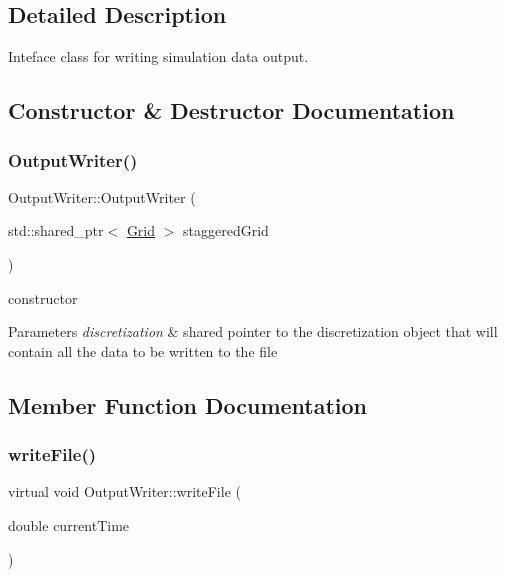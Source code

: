 \subsection{Detailed Description}
Inteface class for writing simulation data output. 

\subsection{Constructor \& Destructor Documentation}
\mbox{\label{classOutputWriter_aa42fc9f21e7a107080c94c413b6b713b}} 
\subsubsection{\texorpdfstring{OutputWriter()}{OutputWriter()}}
{\footnotesize\ttfamily Output\+Writer\+::\+Output\+Writer (\begin{DoxyParamCaption}\item[{std\+::shared\+\_\+ptr$<$ \mbox{\hyperlink{classGrid}{Grid}} $>$}]{staggered\+Grid }\end{DoxyParamCaption})}

constructor 
\begin{DoxyParams}{Parameters}
{\em discretization} & shared pointer to the discretization object that will contain all the data to be written to the file \\
\hline
\end{DoxyParams}


\subsection{Member Function Documentation}
\mbox{\label{classOutputWriter_ac625c204affdc05919388a3549c2e945}} 
\subsubsection{\texorpdfstring{writeFile()}{writeFile()}}
{\footnotesize\ttfamily virtual void Output\+Writer\+::write\+File (\begin{DoxyParamCaption}\item[{double}]{current\+Time }\end{DoxyParamCaption})\hspace{0.3cm}{\ttfamily [pure virtual]}}



